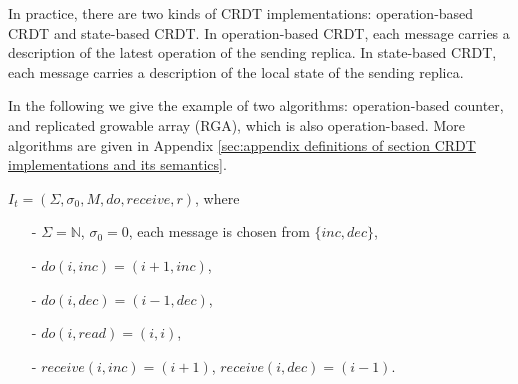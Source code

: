 In practice, there are two kinds of CRDT implementations: operation-based CRDT and state-based CRDT. In operation-based CRDT, each message carries a description of the latest operation of the sending replica. In state-based CRDT, each message carries a description of the local state of the sending replica.

In the following we give the example of two algorithms: operation-based counter, and replicated growable array (RGA), which is also operation-based. More algorithms are given in Appendix \ref{sec:appendix definitions of section CRDT implementations and its semantics}.

\begin{example}
\label{definition:operation-based counter}
$I_t = (\Sigma, \sigma_0, M, \mathit{do},\mathit{receive},r)$, where

\begin{itemize}
\setlength{\itemsep}{0.5pt}
\item[-] $\Sigma = \mathbb{N}$, $\sigma_0 = 0$, each message is chosen from $\{ \mathit{inc}, \mathit{dec} \}$,

\item[-] $\mathit{do}(i,\mathit{inc}) = (i+1,\mathit{inc})$,

\item[-] $\mathit{do}(i,\mathit{dec}) = (i-1,\mathit{dec})$,

\item[-] $\mathit{do}(i,\mathit{read}) = (i,i)$,

\item[-] $\mathit{receive}(i,\mathit{inc}) = (i+1)$, $\mathit{receive}(i,\mathit{dec}) = (i-1)$.
\end{itemize}
\end{example}



